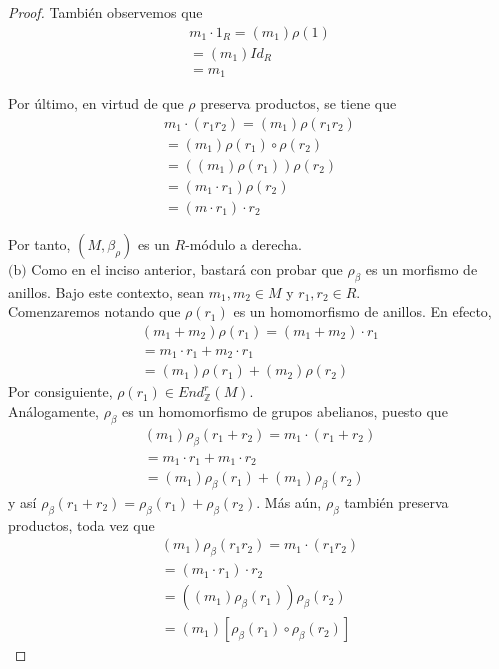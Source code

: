 \documentclass{article}
\newcommand{\lrprth}[1]{
    \left(#1\right)
}
\newcommand{\zend}[2]{
    End_{\mathbb{Z}}^{#2}\lrprth{#1}
}
\theoremstyle{definition}
\theoremstyle{plain}
\theoremstyle{plain}
\theoremstyle{definition}
\theoremstyle{definition}
\theoremstyle{definition}
\theoremstyle{definition}
\theoremstyle{definition}
\theoremstyle{definition}
\begin{document}
\begin{enumerate}
\begin{proof}
También observemos que
\begin{align*}
m_{1} \cdot 1_{R}=\lrprth{m_{1}} \rho \lrprth{1}\\
=\lrprth{m_{1}}Id_{R}\\
=m_{1}
\end{align*}
	
Por último, en virtud de que $\rho$ preserva productos, se tiene que
\begin{align*}
m_{1} \cdot \lrprth{r_{1}r_{2}}=\lrprth{m_{1}} \rho \lrprth{r_{1}r_{2}}\\
=\lrprth{m_{1}} \rho \lrprth{r_{1}} \circ \rho \lrprth{r_{2}}\\
=\lrprth{\lrprth{m_{1}} \rho \lrprth{r_{1}}} \rho \lrprth{r_{2}}\\
=\lrprth{m_{1} \cdot r_{1}} \rho \lrprth{r_{2}}\\
=\lrprth{m \cdot r_{1}} \cdot r_{2}
\end{align*}
	
Por tanto, $\lrprth{M, \beta_{\rho}}$ es un $R$-módulo a derecha.\\

$\boxed{\text{(b)}}$ Como en el inciso anterior, bastará con probar que $\rho_{\beta}$ es un morfismo de anillos. Bajo este contexto, sean $m_{1},m_{2} \in M$ y $r_{1},r_{2} \in R$.\\
	
Comenzaremos notando que $\rho \lrprth{r_{1}}$ es un homomorfismo de anillos. En efecto,
\begin{align*}
\lrprth{m_{1}+m_{2}} \rho \lrprth{r_{1}}=\lrprth{m_{1}+m_{2}} \cdot r_{1}\\
=m_{1} \cdot r_{1} + m_{2} \cdot r_{1}\\
=\lrprth{m_{1}} \rho \lrprth{r_{1}} + \lrprth{m_{2}} \rho \lrprth{r_{2}}
\end{align*}
Por consiguiente, $\rho\lrprth{r_{1}}\in\zend{M}{r}$.\\
	
Análogamente, $\rho_{\beta}$ es un homomorfismo de grupos abelianos, puesto que
\begin{align*}
\lrprth{m_{1}} \rho_{\beta} \lrprth{r_{1}+r_{2}}=m_{1} \cdot \lrprth{r_{1}+r_{2}}\\
=m_{1} \cdot r_{1} + m_{1} \cdot r_{2}\\
= \lrprth{m_{1}} \rho_{\beta} \lrprth{r_{1}} + \lrprth{m_{1}} \rho_{\beta} \lrprth{r_{2}}
\end{align*}
y así $\rho_{\beta} \lrprth{r_{1}+r_{2}} = \rho_{\beta} \lrprth{r_{1}} + \rho_{\beta} \lrprth{r_{2}}$. Más aún, $\rho_{\beta}$ también preserva productos, toda vez que
\begin{align*}
\lrprth{m_{1}} \rho_{\beta} \lrprth{r_{1}r_{2}}=m_{1} \cdot \lrprth{r_{1}r_{2}}\\
=\lrprth{m_{1} \cdot r_{1}} \cdot r_{2}\\
=\lrprth{\lrprth{m_{1}} \rho_{\beta} \lrprth{r_{1}}} \rho_{\beta} \lrprth{r_{2}}\\
=\lrprth{m_{1}} [\rho_{\beta} \lrprth{r_{1}} \circ \rho_{\beta} \lrprth{r_{2}}]
\end{align*}
	

\end{proof}
\end{enumerate}
\end{document}
